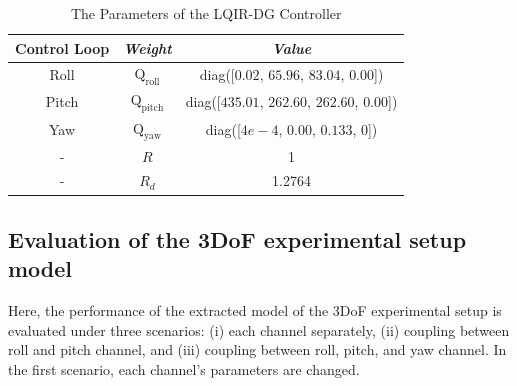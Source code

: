 \documentclass[3p,times]{elsarticle}
\begin{document}
\begin{table}[H]
	\renewcommand{\arraystretch}{1.3}
	\caption{The Parameters of the LQIR-DG Controller}
	\begin{center}
	\begin{tabular}{c c c}
	\hline
	\textbf{Control Loop} & \textbf{\textit{Weight}}& \textbf{\textit{Value}} \\
	\hline
	Roll & 
	$\boldsymbol{{\mathrm{Q_{\text{roll}}}}}$ & diag([$0.02$, $65.96$, $83.04$, $0.00$])\\
	Pitch & 
	$\boldsymbol{{\mathrm{Q_{\text{pitch}}}}}$ & diag([$435.01$, $262.60$, $262.60$, $0.00$])\\
	Yaw & 
	$\boldsymbol{{\mathrm{Q_{\text{yaw}}}}}$ & diag([$4e\!-\!4$, $0.00$, $0.133$, $0$])\\
	-& $R$ & 1\\
	-& $R_{d}$ & 1.2764\\
	\hline
	\end{tabular}
	\end{center}
	\label{tab:control weight_new}
\end{table}




\subsection{Evaluation of the 3DoF experimental setup model}

\noindent Here, the performance of the extracted model of the 3DoF experimental setup is evaluated under three scenarios: (i) each channel separately, (ii) coupling between roll and pitch channel, and (iii) coupling between roll, pitch, and yaw channel. In the first scenario, each channel's parameters are changed.
\end{document}
